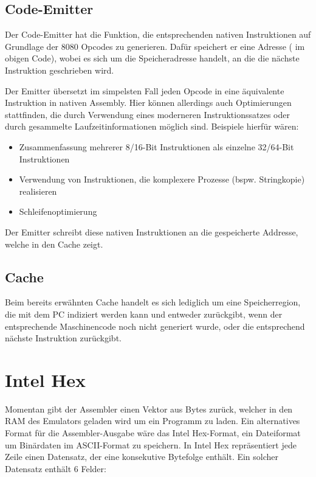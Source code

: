 \subsection{Code-Emitter}

Der Code-Emitter hat die Funktion, die entsprechenden nativen Instruktionen auf Grundlage der 8080 Opcodes zu generieren. Dafür speichert er eine Adresse ( im obigen Code), wobei es sich um die Speicheradresse handelt, an die die nächste Instruktion geschrieben wird.

Der Emitter übersetzt im simpelsten Fall jeden Opcode in eine äquivalente Instruktion in nativen Assembly. Hier können allerdings auch Optimierungen stattfinden, die durch Verwendung eines moderneren Instruktionssatzes oder durch gesammelte Laufzeitinformationen möglich sind. Beispiele hierfür wären:

\begin{itemize}
    \item Zusammenfassung mehrerer 8/16-Bit Instruktionen als einzelne 32/64-Bit Instruktionen
    \item Verwendung von Instruktionen, die komplexere Prozesse (bspw. Stringkopie) realisieren
    \item Schleifenoptimierung
\end{itemize}

Der Emitter schreibt diese nativen Instruktionen an die gespeicherte Addresse, welche in den Cache zeigt.

\subsection{Cache}

Beim bereits erwähnten Cache handelt es sich lediglich um eine Speicherregion, die mit dem PC indiziert werden kann und entweder  zurückgibt, wenn der entsprechende Maschinencode noch nicht generiert wurde, oder die entsprechend nächste Instruktion zurückgibt.


\section{Intel Hex}

Momentan gibt der Assembler einen Vektor aus Bytes zurück, welcher in den RAM des Emulators geladen wird um ein Programm zu laden. Ein alternatives Format für die Assembler-Ausgabe wäre das Intel Hex-Format, ein Dateiformat um Binärdaten im ASCII-Format zu speichern. In Intel Hex repräsentiert jede Zeile einen Datensatz, der eine konsekutive Bytefolge enthält. Ein solcher Datensatz enthält 6 Felder:

